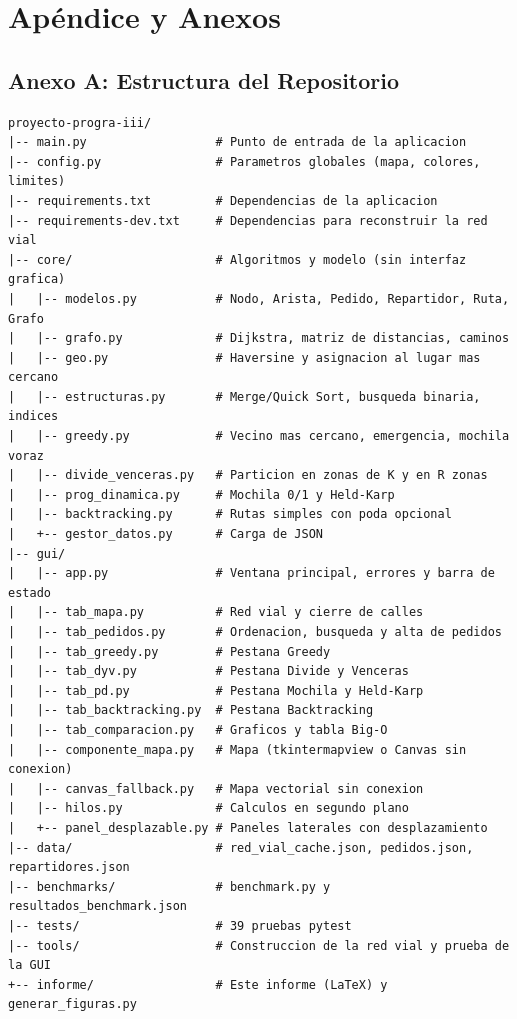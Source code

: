 \chapter*{Apéndice y Anexos}

\section*{Anexo A: Estructura del Repositorio}

\begin{verbatim}
proyecto-progra-iii/
|-- main.py                  # Punto de entrada de la aplicacion
|-- config.py                # Parametros globales (mapa, colores, limites)
|-- requirements.txt         # Dependencias de la aplicacion
|-- requirements-dev.txt     # Dependencias para reconstruir la red vial
|-- core/                    # Algoritmos y modelo (sin interfaz grafica)
|   |-- modelos.py           # Nodo, Arista, Pedido, Repartidor, Ruta, Grafo
|   |-- grafo.py             # Dijkstra, matriz de distancias, caminos
|   |-- geo.py               # Haversine y asignacion al lugar mas cercano
|   |-- estructuras.py       # Merge/Quick Sort, busqueda binaria, indices
|   |-- greedy.py            # Vecino mas cercano, emergencia, mochila voraz
|   |-- divide_venceras.py   # Particion en zonas de K y en R zonas
|   |-- prog_dinamica.py     # Mochila 0/1 y Held-Karp
|   |-- backtracking.py      # Rutas simples con poda opcional
|   +-- gestor_datos.py      # Carga de JSON
|-- gui/
|   |-- app.py               # Ventana principal, errores y barra de estado
|   |-- tab_mapa.py          # Red vial y cierre de calles
|   |-- tab_pedidos.py       # Ordenacion, busqueda y alta de pedidos
|   |-- tab_greedy.py        # Pestana Greedy
|   |-- tab_dyv.py           # Pestana Divide y Venceras
|   |-- tab_pd.py            # Pestana Mochila y Held-Karp
|   |-- tab_backtracking.py  # Pestana Backtracking
|   |-- tab_comparacion.py   # Graficos y tabla Big-O
|   |-- componente_mapa.py   # Mapa (tkintermapview o Canvas sin conexion)
|   |-- canvas_fallback.py   # Mapa vectorial sin conexion
|   |-- hilos.py             # Calculos en segundo plano
|   +-- panel_desplazable.py # Paneles laterales con desplazamiento
|-- data/                    # red_vial_cache.json, pedidos.json, repartidores.json
|-- benchmarks/              # benchmark.py y resultados_benchmark.json
|-- tests/                   # 39 pruebas pytest
|-- tools/                   # Construccion de la red vial y prueba de la GUI
+-- informe/                 # Este informe (LaTeX) y generar_figuras.py
\end{verbatim}

